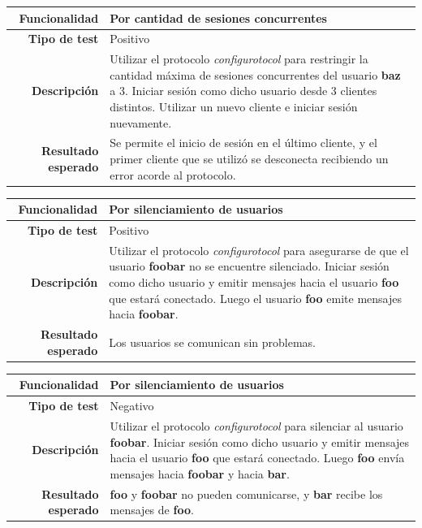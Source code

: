 \documentclass[a4paper,10pt]{article}
\begin{document}
\begin{center}
  \begin{tabular}{|r|p{12.5cm}|}
    \hline
    \textbf{Funcionalidad}	&	Por cantidad de sesiones concurrentes\\
    \hline
    \textbf{Tipo de test}	&	Positivo\\
    \hline
    \textbf{Descripción}	&	Utilizar el protocolo \textit{configurotocol} para restringir la cantidad
					máxima de sesiones concurrentes del usuario \textbf{baz} a 3.
					Iniciar sesión como dicho usuario desde 3 clientes
					distintos. Utilizar un nuevo cliente e iniciar sesión nuevamente.\\
    \hline
    \textbf{Resultado esperado}	&	Se permite el inicio de sesión en el último cliente, y el primer cliente
					que se utilizó se desconecta recibiendo un error acorde al protocolo.\\
    \hline   
  \end{tabular}
\end{center}

\begin{center}
  \begin{tabular}{|r|p{12.5cm}|}
    \hline
    \textbf{Funcionalidad}	&	Por silenciamiento de usuarios\\
    \hline
    \textbf{Tipo de test}	&	Positivo\\
    \hline
    \textbf{Descripción}	&	Utilizar el protocolo \textit{configurotocol} para asegurarse de que el usuario
					\textbf{foobar} no se encuentre silenciado. Iniciar sesión como dicho
					usuario y emitir mensajes hacia el usuario \textbf{foo} que estará conectado.
					Luego el usuario \textbf{foo} emite mensajes hacia \textbf{foobar}.\\
    \hline
    \textbf{Resultado esperado}	&	Los usuarios se comunican sin problemas.\\
    \hline   
  \end{tabular}
\end{center}

\begin{center}
  \begin{tabular}{|r|p{12.5cm}|}
    \hline
    \textbf{Funcionalidad}	&	Por silenciamiento de usuarios\\
    \hline
    \textbf{Tipo de test}	&	Negativo\\
    \hline
    \textbf{Descripción}	&	Utilizar el protocolo \textit{configurotocol} para silenciar al usuario
					\textbf{foobar}. Iniciar sesión como dicho usuario y emitir mensajes hacia
					el usuario \textbf{foo} que estará conectado.
					Luego \textbf{foo} envía mensajes hacia \textbf{foobar} y hacia \textbf{bar}.\\
    \hline
    \textbf{Resultado esperado}	&	\textbf{foo} y \textbf{foobar} no pueden comunicarse, y \textbf{bar} recibe los mensajes de \textbf{foo}.\\
    \hline   
  \end{tabular}
\end{center}
\end{document}
